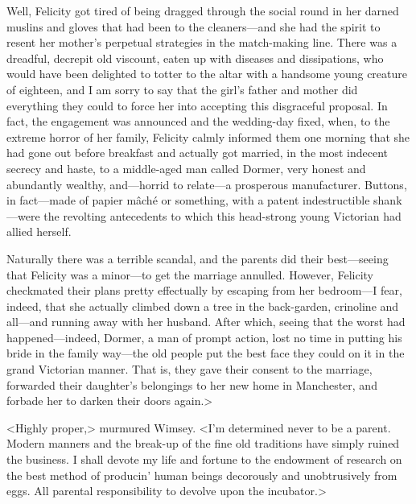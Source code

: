 Well, Felicity got tired of being dragged through the social round in her darned muslins and gloves that had been to the cleaners—and she had the spirit to resent her mother's perpetual strategies in the match-making line. There was a dreadful, decrepit old viscount, eaten up with diseases and dissipations, who would have been delighted to totter to the altar with a handsome young creature of eighteen, and I am sorry to say that the girl's father and mother did everything they could to force her into accepting this disgraceful proposal. In fact, the engagement was announced and the wedding-day fixed, when, to the extreme horror of her family, Felicity calmly informed them one morning that she had gone out before breakfast and actually got married, in the most indecent secrecy and haste, to a middle-aged man called Dormer, very honest and abundantly wealthy, and—horrid to relate—a prosperous manufacturer. Buttons, in fact—made of papier mâché or something, with a patent indestructible shank—were the revolting antecedents to which this head-strong young Victorian had allied herself.

Naturally there was a terrible scandal, and the parents did their best—seeing that Felicity was a minor—to get the marriage annulled. However, Felicity checkmated their plans pretty effectually by escaping from her bedroom—I fear, indeed, that she actually climbed down a tree in the back-garden, crinoline and all—and running away with her husband. After which, seeing that the worst had happened—indeed, Dormer, a man of prompt action, lost no time in putting his bride in the family way—the old people put the best face they could on it in the grand Victorian manner. That is, they gave their consent to the marriage, forwarded their daughter's belongings to her new home in Manchester, and forbade her to darken their doors again.>

<Highly proper,> murmured Wimsey. <I'm determined never to be a parent. Modern manners and the break-up of the fine old traditions have simply ruined the business. I shall devote my life and fortune to the endowment of research on the best method of producin' human beings decorously and unobtrusively from eggs. All parental responsibility to devolve upon the incubator.>

